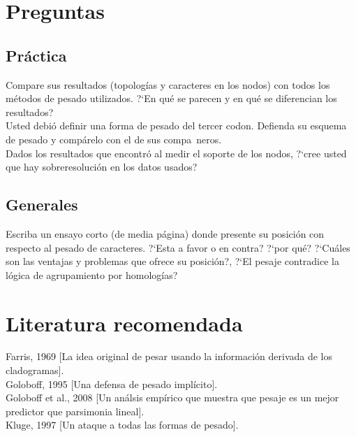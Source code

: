 \section{Preguntas}
\subsection{Pr\'actica}
\noindent
Compare sus resultados (topolog\'ias y caracteres en los nodos) con todos los m\'etodos de pesado utilizados. ?`En qu\'e se parecen y en qu\'e se diferencian los resultados?\\
Usted debi\'o definir una forma de pesado del tercer codon. Defienda su esquema de pesado y comp\'arelo con el de sus compa~neros.\\
Dados los resultados que encontr\'o al medir el soporte de los nodos, ?`cree usted que hay sobreresoluci\'on en los datos usados?\\
\subsection{Generales}
\noindent
Escriba un ensayo corto (de media p\'agina) donde presente su posici\'on con respecto al pesado de caracteres. ?`Esta a favor o en contra? ?`por qu\'e? ?`Cu\'ales son las ventajas y problemas que ofrece su posici\'on?, ?`El pesaje contradice la l\'ogica de agrupamiento por homolog\'ias?\\

\section{Literatura recomendada}
\noindent
Farris, 1969 [La idea original de pesar usando la informaci\'on derivada de los cladogramas].\\
Goloboff, 1995 [Una defensa de pesado impl\'icito].\\
Goloboff et al., 2008 [Un an\'alsis emp\'irico que muestra que pesaje es un mejor predictor que parsimonia lineal].\\
Kluge, 1997 [Un ataque a todas las formas de pesado].
